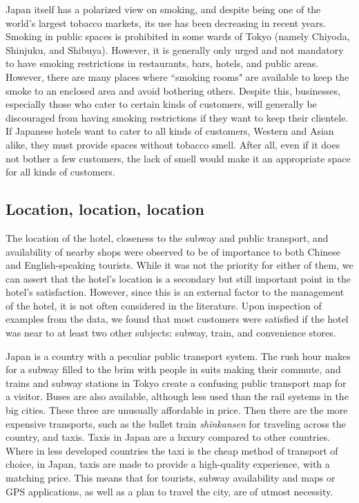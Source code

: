 \documentclass[smallextended,natbib]{svjour3}       %
\begin{document}
    Japan itself has a polarized view on smoking, and despite being one of the world's largest tobacco markets, its use has been decreasing in recent years. Smoking in public spaces is prohibited in some wards of Tokyo (namely Chiyoda, Shinjuku, and Shibuya). However, it is generally only urged and not mandatory to have smoking restrictions in restaurants, bars, hotels, and public areas. However, there are many places where ``smoking rooms" are available to keep the smoke to an enclosed area and avoid bothering others. Despite this, businesses, especially those who cater to certain kinds of customers, will generally be discouraged from having smoking restrictions if they want to keep their clientele. If Japanese hotels want to cater to all kinds of customers, Western and Asian alike, they must provide spaces without tobacco smell. After all, even if it does not bother a few customers, the lack of smell would make it an appropriate space for all kinds of customers. 


  \subsection{Location, location, location}\label{disc:location}

    The location of the hotel, closeness to the subway and public transport, and availability of nearby shops were observed to be of importance to both Chinese and English-speaking tourists. While it was not the priority for either of them, we can assert that the hotel's location is a secondary but still important point in the hotel's satisfaction. However, since this is an external factor to the management of the hotel, it is not often considered in the literature. Upon inspection of examples from the data, we found that most customers were satisfied if the hotel was near to at least two other subjects: subway, train, and convenience stores. 

    Japan is a country with a peculiar public transport system. The rush hour makes for a subway filled to the brim with people in suits making their commute, and trains and subway stations in Tokyo create a confusing public transport map for a visitor. Buses are also available, although less used than the rail systems in the big cities. These three are unusually affordable in price. Then there are the more expensive transports, such as the bullet train \textit{shinkansen} for traveling across the country, and taxis. Taxis in Japan are a luxury compared to other countries. Where in less developed countries the taxi is the cheap method of transport of choice, in Japan, taxis are made to provide a high-quality experience, with a matching price. This means that for tourists, subway availability and maps or GPS applications, as well as a plan to travel the city, are of utmost necessity.
\end{document}
